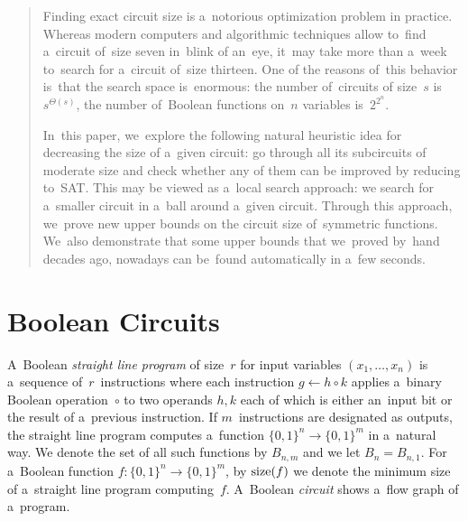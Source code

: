 \maketitle

\begin{abstract}
Finding exact circuit size
is a~notorious optimization
problem in practice. Whereas modern computers
and algorithmic techniques allow to~find a~circuit
of~size seven in~blink of an~eye, it~may take more
than a~week to~search for a~circuit of~size thirteen.
One of the reasons of~this behavior is~that the search
space is~enormous: the number of~circuits of size~$s$
is~$s^{\Theta(s)}$, the number of~Boolean functions on~$n$ variables is~$2^{2^n}$.

In~this paper, we~explore the following natural
heuristic idea for decreasing the size of
a~given circuit: go through all its subcircuits
of moderate size and check whether
any of them can be improved by reducing to~SAT.
This may be viewed
as a~local search approach: we search for a~smaller
circuit in a~ball around a~given circuit.
Through this approach, we~prove
new upper bounds on the circuit size
of~symmetric functions. We~also demonstrate that
some upper bounds that we~proved by~hand
decades ago, nowadays can be~found automatically
in a~few seconds.
\end{abstract}




\section{Boolean Circuits}
A~Boolean \emph{straight line program}
of size~$r$ for input variables $(x_1, \dotsc, x_n)$
is a~sequence of~$r$~instructions where each
instruction $g \gets h \circ k$
applies a~binary Boolean operation~$\circ$ to
two operands $h,k$ each of which is either an~input bit
or the result of a~previous instruction.
If $m$~instructions are designated as outputs,
the straight line program computes a~function
$\{0,1\}^n \to \{0,1\}^m$ in a~natural way.
We denote the set of all such functions by $B_{n,m}$ and we let $B_n=B_{n,1}$.
For
a~Boolean function $f \colon \{0,1\}^n \to \{0,1\}^m$,
by $\operatorname{size}(f)$ we denote the minimum size of
a~straight line program
computing~$f$. A~Boolean \emph{circuit}
shows a~flow graph of a~program.

